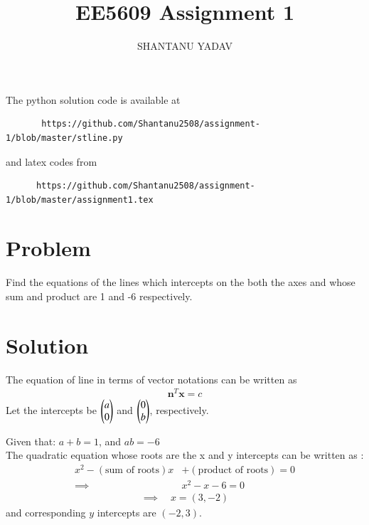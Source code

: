 \documentclass[journal,12pt,twocolumn]{IEEEtran}
\begin{document}
     \def\rightbox#1{\makebox[0in][r]{#1}}
     \def\centbox#1{\makebox[0in]{#1}}
     \def\topbox#1{\raisebox{-\baselineskip}[0in][0in]{#1}}
     \def\midbox#1{\raisebox{-0.5\baselineskip}[0in][0in]{#1}}
\vspace{3cm}
\title{EE5609 Assignment 1}
\author{SHANTANU YADAV }
\maketitle
\newpage
\bigskip
\renewcommand{\thefigure}{\theenumi}
\renewcommand{\thetable}{\theenumi}
The python solution code is available at
\begin{lstlisting}
       https://github.com/Shantanu2508/assignment-1/blob/master/stline.py
\end{lstlisting}
%
and latex codes from 
\begin{lstlisting}
      https://github.com/Shantanu2508/assignment-1/blob/master/assignment1.tex
\end{lstlisting}
%
\section{Problem}
Find the equations of the lines which intercepts on the both the axes and whose sum and product are 1 and -6 respectively.

\section{Solution}
The equation of line in terms of vector notations can be written as
\begin{align}
	{\mathbf{n}^T}{\mathbf x} = c  
\end{align}
Let the intercepts be $\begin{pmatrix}a \\ 0\end{pmatrix}$ and $\begin{pmatrix}0 \\ b\end{pmatrix}$, respectively.

\noindent
Given that: \quad $ a + b = 1 $, \quad and \quad $ ab = -6$ \\
The quadratic equation whose roots are the x and y intercepts can be written 
as :
\begin{align}
	x^2 - (\text{sum of roots})x &+ (\text{product of roots}) = 0 \\
	\implies \qquad & x^2 - x -6 =0
\end{align}
\begin{align}
	\implies \quad x=(3,-2) 
\end{align}
and corresponding $y$ intercepts are $(-2,3)$. \\
\end{document}
